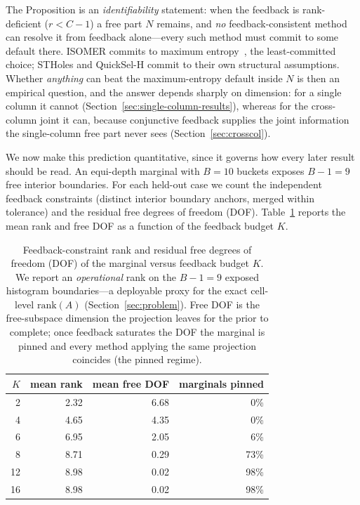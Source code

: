 \documentclass[preprint,12pt]{elsarticle}
\begin{document}
The Proposition is an \emph{identifiability} statement: when the feedback is rank-deficient
($r<C-1$) a free part $N$ remains, and \emph{no} feedback-consistent method can resolve it
from feedback alone---every such method must commit to some default there. ISOMER commits to
maximum entropy~\cite{markl2007consistent}, the least-committed choice; STHoles and
QuickSel-H commit to their own structural assumptions. Whether \emph{anything} can beat the
maximum-entropy default inside $N$ is then an empirical question, and the answer depends
sharply on dimension: for a single column it cannot
(Section~\ref{sec:single-column-results}), whereas for the cross-column joint it can, because
conjunctive feedback supplies the joint information the single-column free part never sees
(Section~\ref{sec:crosscol}).

We now make this prediction quantitative, since it governs how every later result should be
read. An equi-depth
marginal with $B{=}10$ buckets exposes $B-1=9$ free interior boundaries. For each held-out
case we count the independent feedback constraints (distinct interior boundary
anchors, merged within tolerance) and the residual free degrees of freedom (DOF).
Table~\ref{tab:mr_rank} reports the mean rank and free DOF as a function of the
feedback budget $K$.

\begin{table}[t]
  \centering\small
  \caption{Feedback-constraint rank and residual free degrees of freedom (DOF) of the
  marginal versus feedback budget $K$. We report an \emph{operational} rank on the
  $B{-}1=9$ exposed histogram boundaries---a deployable proxy for the exact cell-level
  $\mathrm{rank}(A)$ (Section~\ref{sec:problem}). Free DOF is the free-subspace dimension the
  projection leaves for the prior to complete; once feedback saturates the DOF the
  marginal is pinned and every method applying the same projection coincides
  (the pinned regime).}
  \label{tab:mr_rank}
  \setlength{\tabcolsep}{8pt}
  \begin{tabular}{r rr r}
    \toprule
    $K$ & mean rank & mean free DOF & marginals pinned \\
    \midrule
    2  & 2.32 & 6.68 & 0\% \\
    4  & 4.65 & 4.35 & 0\% \\
    6  & 6.95 & 2.05 & 6\% \\
    8  & 8.71 & 0.29 & 73\% \\
    12 & 8.98 & 0.02 & 98\% \\
    16 & 8.98 & 0.02 & 98\% \\
    \bottomrule
  \end{tabular}
\end{table}
\end{document}
